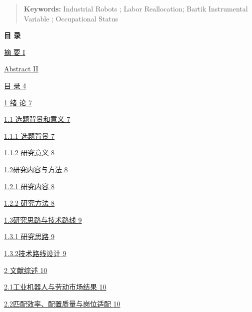 \begin{quote}
\textbf{Keywords:} Industrial Robots ; Labor Reallocation; Bartik Instrumental Variable ; Occupational Status
\end{quote}

\protect{}\label{_Toc1141832933}{}\textbf{目 录}

\hyperref[_Toc1280781355]{摘 要 \hyperref[_Toc1280781355]{I}}

\hyperref[_Toc1863639604]{Abstract \hyperref[_Toc1863639604]{II}}

\hyperref[_Toc1141832933]{目 录 \hyperref[_Toc1141832933]{4}}

\hyperref[ux7eea-ux8bba]{1 绪 论 \hyperref[ux7eea-ux8bba]{7}}

\hyperref[ux9009ux9898ux80ccux666fux548cux610fux4e49]{1.1 选题背景和意义 \hyperref[ux9009ux9898ux80ccux666fux548cux610fux4e49]{7}}

\hyperref[ux9009ux9898ux80ccux666f]{1.1.1 选题背景 \hyperref[ux9009ux9898ux80ccux666f]{7}}

\hyperref[ux7814ux7a76ux610fux4e49]{1.1.2 研究意义 \hyperref[ux7814ux7a76ux610fux4e49]{8}}

\hyperref[ux7814ux7a76ux5185ux5bb9ux4e0eux65b9ux6cd5]{1.2研究内容与方法 \hyperref[ux7814ux7a76ux5185ux5bb9ux4e0eux65b9ux6cd5]{8}}

\hyperref[ux7814ux7a76ux5185ux5bb9]{1.2.1 研究内容 \hyperref[ux7814ux7a76ux5185ux5bb9]{8}}

\hyperref[ux7814ux7a76ux65b9ux6cd5]{1.2.2 研究方法 \hyperref[ux7814ux7a76ux65b9ux6cd5]{8}}

\hyperref[ux7814ux7a76ux601dux8defux4e0eux6280ux672fux8defux7ebf]{1.3研究思路与技术路线 \hyperref[ux7814ux7a76ux601dux8defux4e0eux6280ux672fux8defux7ebf]{9}}

\hyperref[ux7814ux7a76ux601dux8def]{1.3.1 研究思路 \hyperref[ux7814ux7a76ux601dux8def]{9}}

\hyperref[ux6280ux672fux8defux7ebfux8bbeux8ba1]{1.3.2技术路线设计 \hyperref[ux6280ux672fux8defux7ebfux8bbeux8ba1]{9}}

\hyperref[ux6587ux732eux7efcux8ff0]{2 文献综述 \hyperref[ux6587ux732eux7efcux8ff0]{10}}

\hyperref[ux5de5ux4e1aux673aux5668ux4ebaux4e0eux52b3ux52a8ux5e02ux573aux7ed3ux679c]{2.1工业机器人与劳动市场结果 \hyperref[ux5de5ux4e1aux673aux5668ux4ebaux4e0eux52b3ux52a8ux5e02ux573aux7ed3ux679c]{10}}

\hyperref[ux5339ux914dux6548ux7387ux914dux7f6eux8d28ux91cfux4e0eux5c97ux4f4dux9002ux914d]{2.2匹配效率、配置质量与岗位适配 \hyperref[ux5339ux914dux6548ux7387ux914dux7f6eux8d28ux91cfux4e0eux5c97ux4f4dux9002ux914d]{10}}

